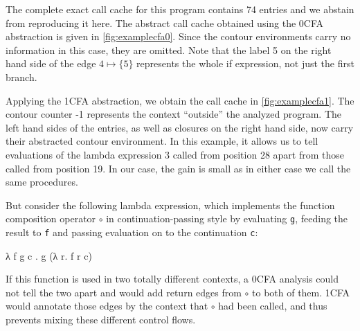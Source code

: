 \documentclass[a4paper,halfparskip,DIV=10,11pt]{scrbook}
\begin{document}
The complete exact call cache for this program contains 74 entries and we abstain from reproducing it here. The abstract call cache obtained using the 0CFA abstraction is given in \vref{fig:examplecfa0}. Since the contour environments carry no information in this case, they are omitted. Note that the label 5 on the right hand side of the edge $4 \mapsto \{5\}$ represents the whole if expression, not just the first branch.

Applying the 1CFA abstraction, we obtain the call cache in \vref{fig:examplecfa1}. The contour counter -1 represents the context “outside” the analyzed program.  The left hand sides of the entries, as well as closures on the right hand side, now carry their abstracted contour environment. In this example, it allows us to tell evaluations of the lambda expression 3 called from position 28 apart from those called from position 19. In our case, the gain is small as in either case we call the same procedures. %

But consider the following lambda expression, which implements the function composition operator $\circ$ in continuation-passing style by evaluating \verb-g-, feeding the result to \verb-f- and passing evaluation on to the continuation \verb-c-:
\begin{center}
\ttfamily λ f g c . g (λ r. f r c)
\end{center}
If this function is used in two totally different contexts, a 0CFA analysis could not tell the two apart and would add return edges from $\circ$ to both of them. 1CFA would annotate those edges by the context that $\circ$ had been called, and thus prevents mixing these different control flows.
\end{document}
